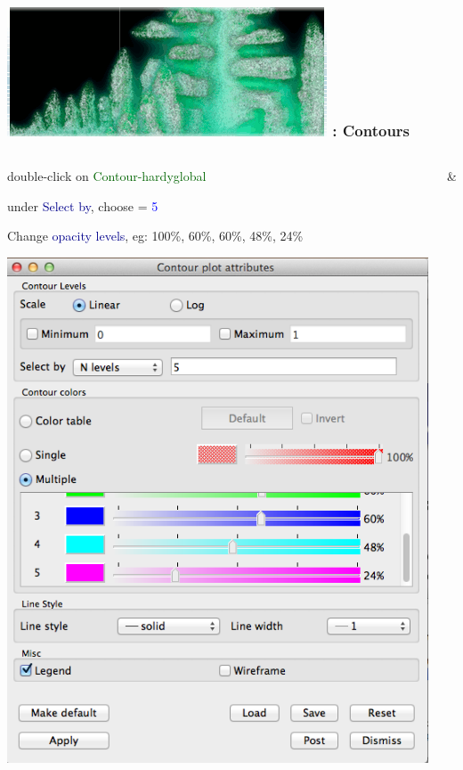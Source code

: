 \begin{frame}
\frametitle{\href{https://wci.llnl.gov/simulation/computer-codes/visit/}{\includegraphics[height=.85cm]{figs/visit-logos/VisIt-04}} \hspace{-.85cm}{\bf \textcolor{lightgray}{VisIt}}: Contours}

\begin{columns}
\begin{column}{6cm}
        \textcolor{DarkBlue}{}
        double-click on \textcolor{DarkGreen}{Contour-hardyglobal}

        \pause
        \textcolor{DarkBlue}{}
        under \textcolor{DarkBlue}{Select by}, choose \framebox{\textcolor{DarkGreen}{N levels}} = \textcolor{blue}{5} \Enter

        \pause
        \textcolor{DarkBlue}{}
        Change \textcolor{DarkBlue}{opacity levels}, eg: 100\%, 60\%, 60\%, 48\%, 24\%

        \centering
        \includegraphics[width=.65\columnwidth]{figs/visit-pract/VisIt_contour-props}
\end{column}
\begin{column}{5.5cm}
        \textcolor{DarkBlue}{}
        \&


\end{column}
\end{columns}
\end{frame}
